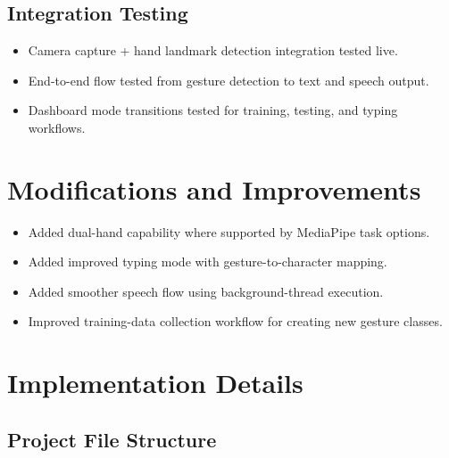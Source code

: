 \subsection{Integration Testing}
\begin{itemize}
    \item Camera capture + hand landmark detection integration tested live.
    \item End-to-end flow tested from gesture detection to text and speech output.
    \item Dashboard mode transitions tested for training, testing, and typing workflows.
\end{itemize}

\section{Modifications and Improvements}

\begin{itemize}
    \item Added dual-hand capability where supported by MediaPipe task options.
    \item Added improved typing mode with gesture-to-character mapping.
    \item Added smoother speech flow using background-thread execution.
    \item Improved training-data collection workflow for creating new gesture classes.
\end{itemize}

\section{Implementation Details}

\subsection{Project File Structure}

